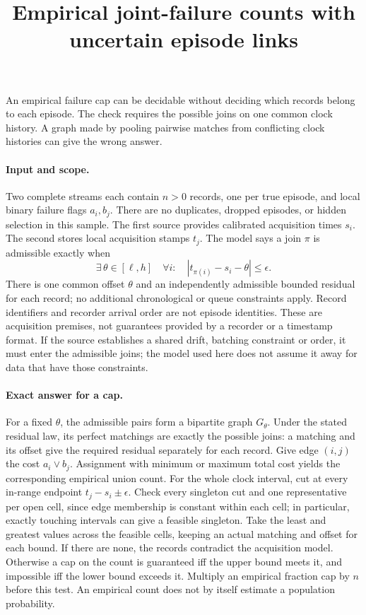 \documentclass[11pt]{article}
\title{Empirical joint-failure counts with uncertain episode links}
\begin{document}
\maketitle

An empirical failure cap can be decidable without deciding which
records belong to each episode. The check requires the possible joins
on one common clock history. A graph made by pooling pairwise matches
from conflicting clock histories can give the wrong answer.

\paragraph{Input and scope.}
Two complete streams each contain \(n>0\) records, one per true episode,
and local binary failure flags \(a_i,b_j\). There are no duplicates,
dropped episodes, or hidden selection in this sample. The first source
provides calibrated acquisition times \(s_i\). The second stores local
acquisition stamps \(t_j\). The model says a join \(\pi\) is admissible
exactly when
\[
 \exists\,\theta\in[\ell,h]\quad \forall i:\quad
          |t_{\pi(i)}-s_i-\theta|\le\epsilon .
\]
There is one common offset \(\theta\) and an independently admissible
bounded residual for each record; no additional chronological or queue
constraints apply. Record identifiers and recorder arrival order are
not episode identities. These are acquisition premises, not guarantees
provided by a recorder or a timestamp format. If the source establishes
a shared drift, batching constraint or order, it must enter the
admissible joins; the model used here does not assume it away for data
that have those constraints.

\paragraph{Exact answer for a cap.}
For a fixed \(\theta\), the admissible pairs form a bipartite graph
\(G_\theta\). Under the stated residual law, its perfect matchings
are exactly the possible joins: a matching and its offset give
the required residual separately for each record. Give edge
\((i,j)\) the cost \(a_i\lor b_j\). Assignment with minimum or maximum
total cost yields the corresponding empirical union count. For the
whole clock interval, cut at every in-range endpoint
\(t_j-s_i\pm\epsilon\). Check every singleton cut and one representative
per open cell, since edge membership is constant within each cell;
in particular, exactly touching intervals can give a feasible
singleton. Take the least and greatest values across the feasible
cells, keeping an actual matching and offset for each bound.
If there are none, the records contradict the acquisition model.
Otherwise a cap on the count is guaranteed iff the upper bound
meets it, and impossible iff the lower bound exceeds it. Multiply
an empirical fraction cap by \(n\) before this test. An empirical
count does not by itself estimate a population probability.
\end{document}
